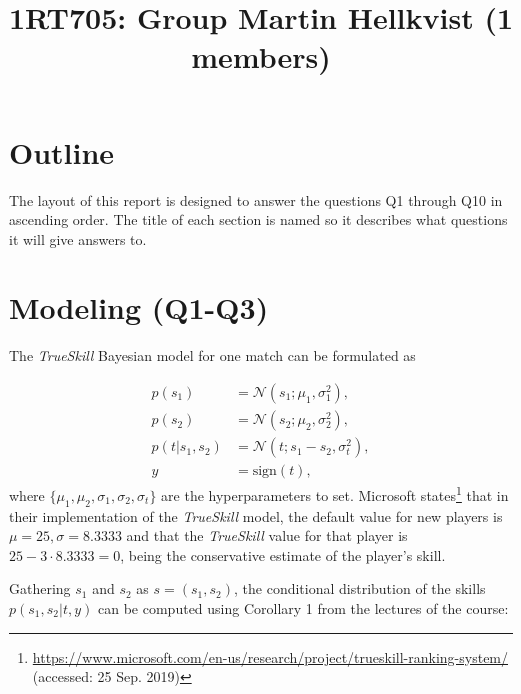 \documentclass{article}
\title{1RT705: Group Martin Hellkvist (1 members)}
\begin{document}
	
	\maketitle
%	
	
	\section{Outline}
	The layout of this report is designed to answer the questions Q1 through Q10 in ascending order. The title of each section is named so it describes what questions it will give answers to.
	\section{Modeling (Q1-Q3)}
	\label{sec:modeling}
	The \textit{TrueSkill} Bayesian model for one match can be formulated as
	
	\begin{subequations}
	\begin{align}\label{eqn:model}
	p(s_1) &= \mathcal{N}(s_1; \mu_1, \sigma_1^2),\\
	p(s_2) &= \mathcal{N}(s_2; \mu_2, \sigma_2^2),\\
	p(t|s_1, s_2) &= \mathcal{N}(t; s_1-s_2, \sigma_t^2),\\
	y &= \text{sign}(t),
	\end{align}
	\end{subequations}
	where $ \{\mu_1,\mu_2,\sigma_1,\sigma_2,\sigma_t\} $ are the hyperparameters to set. Microsoft states\footnote{\url{https://www.microsoft.com/en-us/research/project/trueskill-ranking-system/} (accessed: 25 Sep. 2019)} that in their implementation of the \textit{TrueSkill} model, the default value for new players is $ \mu=25, \sigma=8.3333 $ and that the \textit{TrueSkill} value for that player is $25-3\cdot8.3333=0$, being the conservative estimate of the player's skill. 
	
	Gathering $ s_1 $ and $ s_2 $ as $s = (s_1, s_2)$, the conditional distribution of the skills $p(s_1, s_2|t,y)$ can be computed using Corollary 1 from the lectures of the course:
	
\end{document}
